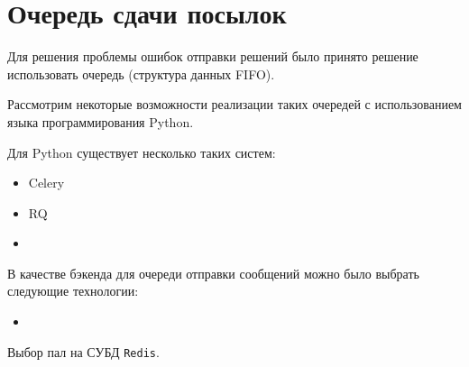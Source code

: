 \section{Очередь сдачи посылок}

Для решения проблемы ошибок отправки решений было принято решение использовать очередь (структура данных FIFO).

Рассмотрим некоторые возможности реализации таких очередей с использованием языка программирования Python.

Для Python существует несколько таких систем:

\begin{itemize}
    \item Celery
    \item RQ
    \item 
\end{itemize}{}

В качестве бэкенда для очереди отправки сообщений можно было выбрать следующие технологии:

\begin{itemize}
    \item 
\end{itemize}

Выбор пал на СУБД \texttt{Redis}.

